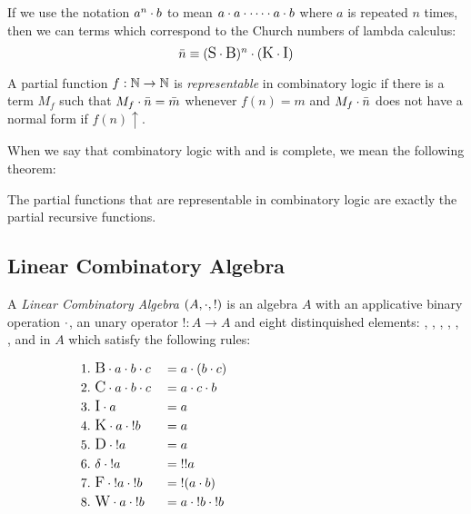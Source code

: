 If we use the notation $a^n \. b$ to mean $a\.a\.\cdots\.a\.b$ where $a$ is repeated $n$ times,
then we can terms which correspond to the Church numbers of lambda calculus:
\[
  \bar{n}\equiv (\Sc\.\Bc)^n\.(\Kc\.\Ic)
\]

\begin{definition}\label{def:functions_representable_in_combinatory_logic}
  A partial function $f:\nat \to \nat$ is \emph{representable} in combinatory logic if there is a
  term $M_f$ such that $M_f\.\bar{n} = \bar{m}$ whenever $f(n) = m$ and $M_f\.\bar{n} $ does
  not have a normal form if $f(n)\uparrow$.
\end{definition}

When we say that combinatory logic with \Sc and \Kc is complete, we mean the following theorem:
\begin{theorem}\label{thm:combinatory_logic_is_complete}
  The partial functions that are representable in combinatory logic are exactly the partial 
  recursive functions.  
\end{theorem}


\subsection{Linear Combinatory Algebra} %
\label{sub:linear_combinatory_algebra}

\begin{definition}\label{def:linear_combinatory_algebra}
  A \emph{Linear Combinatory Algebra} $(A,\.,!)$ is an algebra $A$ with an applicative binary 
  operation $\.$, an unary operator $!:A\to A$ and eight distinquished elements: \Bc, \Cc, \Ic,
  \Kc, \Dc, \dc, \Fc and \Wc in $A$ which satisfy the following rules:
  \begin{singlespace}
    \begin{align*}
      &1.\ \Bc\. a\.b\.c     &&=a\.(b\.c)&\qquad\qquad\qquad\qquad\qquad\qquad\\
      &2.\ \Cc \. a\.b\.c    &&=a\.c\.b\\
      &3.\ \Ic \. a          &&=a\\
      &4.\ \Kc \. a\.{!}b    &&=a\\
      &5.\ \Dc\.{!}a         &&=a\\
      &6.\ \dc\.{!}a         &&={!!}a\\
      &7.\ \Fc\.{!}a\.{!}b   &&={!}(a\.b)\\
      &8.\ \Wc\. a\.{!}b     && = a\.{!}b\.{!}b
    \end{align*}
  \end{singlespace}
\end{definition}

